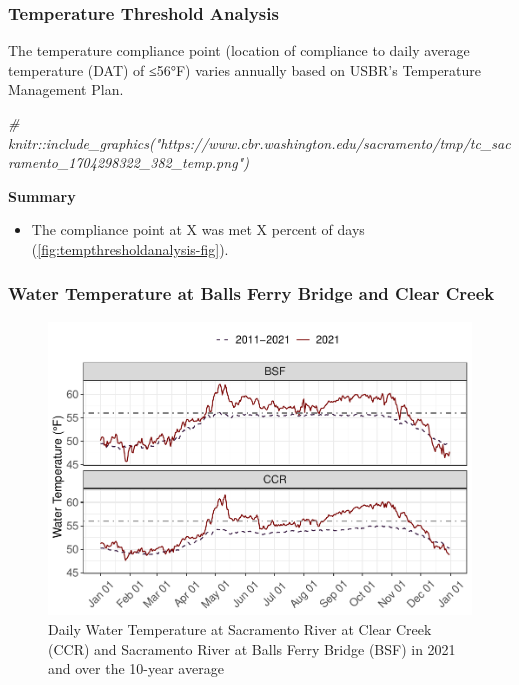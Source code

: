 \documentclass[
]{book}
\newenvironment{Shaded}{\begin{snugshade}}{\end{snugshade}}
\newcommand{\CommentTok}[1]{\textcolor[rgb]{0.56,0.35,0.01}{\textit{#1}}}
\providecommand{\tightlist}{%
  \setlength{\itemsep}{0pt}\setlength{\parskip}{0pt}}
\theoremstyle{definition}
\theoremstyle{definition}
\theoremstyle{definition}
\theoremstyle{definition}
\theoremstyle{remark}
\begin{document}
\hypertarget{temp-thresholds}{%
\subsubsection{Temperature Threshold Analysis}\label{temp-thresholds}}

The temperature compliance point (location of compliance to daily average temperature (DAT) of ≤56°F) varies annually based on USBR's Temperature Management Plan.

\begin{Shaded}
\begin{Highlighting}[]
\CommentTok{\# knitr::include\_graphics("https://www.cbr.washington.edu/sacramento/tmp/tc\_sacramento\_1704298322\_382\_temp.png")}
\end{Highlighting}
\end{Shaded}

\textbf{Summary}

\begin{itemize}
\tightlist
\item
  The compliance point at X was met X percent of days (\ref{fig:tempthresholdanalysis-fig}).
\end{itemize}

\hypertarget{water-temperature-at-balls-ferry-bridge-and-clear-creek}{%
\subsubsection{Water Temperature at Balls Ferry Bridge and Clear Creek}\label{water-temperature-at-balls-ferry-bridge-and-clear-creek}}

\begin{figure}
\centering
\includegraphics{_main_files/figure-latex/historicalwtemp-fig-1.pdf}
\caption{\label{fig:historicalwtemp-fig}Daily Water Temperature at Sacramento River at Clear Creek (CCR) and Sacramento River at Balls Ferry Bridge (BSF) in 2021 and over the 10-year average}
\end{figure}
\end{document}
